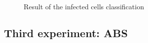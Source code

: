 \documentclass{article}
\begin{document}
\begin{figure}[h!]
\begin{center}
{      \label{textures res}
                         }
     \end{center}
\caption{Result of the infected cells classification}
\end{figure}


\subsection{Third experiment: ABS}
\end{document}
